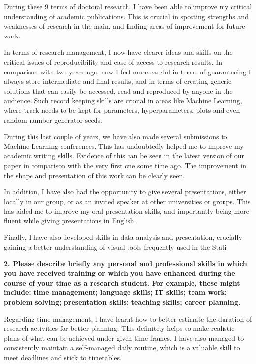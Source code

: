 \documentclass[pdftex,12pt,a4paper]{article}
\theoremstyle{definition}
\theoremstyle{remark}
\begin{document}
During these 9 terms of doctoral research, I have been able to improve my critical understanding of academic publications. This is crucial in spotting strengths and weaknesses of research in the main, and finding areas of improvement for future work.

In terms of research management, I now have clearer ideas and skills on the critical issues of reproducibility and ease of access to research results. In comparison with two years ago, now I feel more careful in terms of guaranteeing I always store intermediate and final results, and in terms of creating generic solutions that can easily be accessed, read and reproduced by anyone in the audience. Such record keeping skills are crucial in areas like Machine Learning, where track needs to be kept for parameters, hyperparameters, plots and even random number generator seeds.

During this last couple of years, we have also made several submissions to Machine Learning conferences. This has undoubtedly helped me to improve my academic writing skills. Evidence of this can be seen in the latest version of our paper in comparison with the very first one some time ago. The improvement in the shape and presentation of this work can be clearly seen.

In addition, I have also had the opportunity to give several presentations, either locally in our group, or as an invited speaker at other universities or groups. This has aided me to improve my oral presentation skills, and importantly being more fluent while giving presentations in English.

Finally, I have also developed skills in data analysis and presentation, crucially gaining a better understanding of visual tools frequently used in the Stati

\textbf{2. Please describe briefly any personal and professional skills in which you have received training or which you have enhanced during the course of your time as a research student. For example, these might include: time management; language skills; IT skills; team work; problem solving; presentation skills; teaching skills; career planning.}

Regarding time management, I have learnt how to better estimate the duration of research activities for better planning. This definitely helps to make realistic plans of what can be achieved under given time frames. I have also managed to consistently maintain a self-managed daily routine, which is a valuable skill to meet deadlines and stick to timetables.
\end{document}
